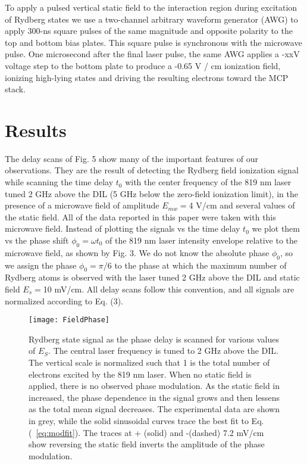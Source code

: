 \documentclass[aps,pra,preprint,groupedaddress]{revtex4-1}
\begin{document}
To apply a pulsed vertical static field to the interaction region during excitation of Rydberg states we use a two-channel arbitrary waveform generator (AWG) to apply 300-ns square pulses of the same magnitude and opposite polarity to the top and bottom bias plates. This square pulse is synchronous with the microwave pulse. One microsecond after the final laser pulse, the same AWG applies a -xxV voltage step to the bottom plate to produce a -0.65 V / cm ionization field, ionizing high-lying states and driving the resulting electrons toward the MCP stack.


\section{\label{results} Results}


The delay scans of Fig. 5 show many of the important features of our observations. They are the result of detecting the Rydberg field ionization signal while scanning the time delay $t_0$ with the center frequency of the 819 nm laser tuned 2 GHz above the DIL (5 GHz below the zero-field ionization limit), in the presence of a microwave field of amplitude $E_{mw}=$4 V/cm and several values of the static field. All of the data reported in this paper were taken with this microwave field. Instead of plotting the signals vs the time delay $t_0$ we plot them vs the phase shift $\phi_0=\omega t_0$ of the 819 nm laser intensity envelope relative to the microwave field, as shown by Fig. 3. We do not know the absolute phase $\phi_0$, so we assign the phase $\phi_0=\pi/6$ to the phase at which the maximum number of Rydberg atoms is observed with the laser tuned 2 GHz above the DIL and static field $E_s=$10 mV/cm. All delay scans follow this convention, and all signals are normalized according to Eq. (3).


\begin{figure}
	\texttt{[image: FieldPhase]}
	\caption{Rydberg state signal as the phase delay is scanned for various values of $E_S$. The central laser frequency is tuned to 2 GHz above the DIL. The vertical scale is normalized such that 1 is the total number of electrons excited by the 819 nm laser. When no static field is applied, there is no observed phase modulation. As the static field in increased, the phase dependence in the signal grows and then lessens as the total mean signal decreases. The experimental data are shown in grey, while the solid sinusoidal curves trace the best fit to Eq. (~\ref{eq:modfit}). The traces at + (solid) and -(dashed) 7.2 mV/cm show reversing the static field inverts the amplitude of the phase modulation.}
	\label{fig:fph}
\end{figure}
\end{document}
